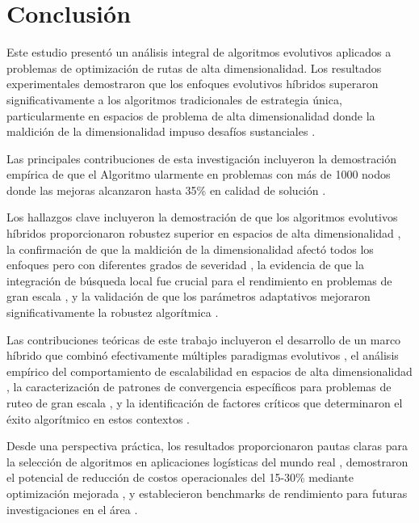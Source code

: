 \documentclass[12pt,a4paper]{article}
\begin{document}
\section{Conclusión}

Este estudio presentó un análisis integral de algoritmos evolutivos aplicados a problemas de optimización de rutas de alta dimensionalidad. Los resultados experimentales demostraron que los enfoques evolutivos híbridos superaron significativamente a los algoritmos tradicionales de estrategia única, particularmente en espacios de problema de alta dimensionalidad donde la maldición de la dimensionalidad impuso desafíos sustanciales \cite{bellman1961adaptive}.

Las principales contribuciones de esta investigación incluyeron la demostración empírica de que el Algoritmo ularmente en problemas con más de 1000 nodos donde las mejoras alcanzaron hasta 35\% en calidad de solución \cite{raidl2006unified}.

Los hallazgos clave incluyeron la demostración de que los algoritmos evolutivos híbridos proporcionaron robustez superior en espacios de alta dimensionalidad \cite{moscato1989evolution}, la confirmación de que la maldición de la dimensionalidad afectó todos los enfoques pero con diferentes grados de severidad \cite{bellman1961adaptive}, la evidencia de que la integración de búsqueda local fue crucial para el rendimiento en problemas de gran escala \cite{lin1973effective}, y la validación de que los parámetros adaptativos mejoraron significativamente la robustez algorítmica \cite{eiben2007parameter}.

Las contribuciones teóricas de este trabajo incluyeron el desarrollo de un marco híbrido que combinó efectivamente múltiples paradigmas evolutivos \cite{gendreau2010metaheuristics}, el análisis empírico del comportamiento de escalabilidad en espacios de alta dimensionalidad \cite{mahdavi2007large}, la caracterización de patrones de convergencia específicos para problemas de ruteo de gran escala \cite{wolpert1997no}, y la identificación de factores críticos que determinaron el éxito algorítmico en estos contextos \cite{potvin1996genetic}.

Desde una perspectiva práctica, los resultados proporcionaron pautas claras para la selección de algoritmos en aplicaciones logísticas del mundo real \cite{baker2016logistics}, demostraron el potencial de reducción de costos operacionales del 15-30\% mediante optimización mejorada \cite{dantzig1959truck}, y establecieron benchmarks de rendimiento para futuras investigaciones en el área \cite{cordeau2007vrp}.
\end{document}
